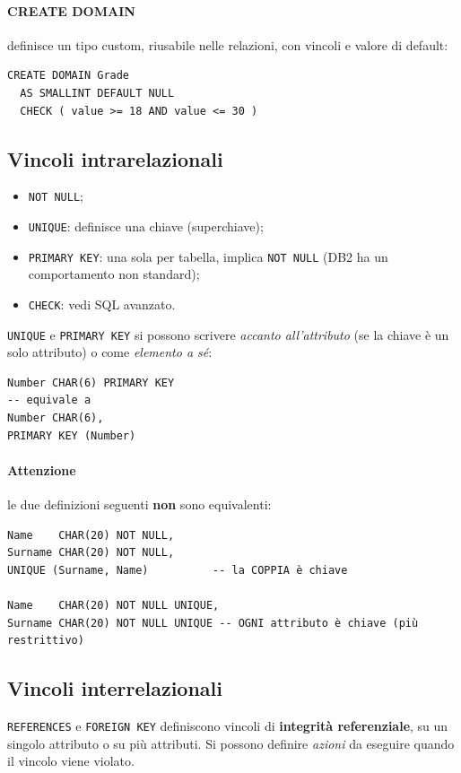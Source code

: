 \documentclass[a4paper,12pt]{article}
\begin{document}
\paragraph{CREATE DOMAIN} definisce un tipo custom, riusabile nelle relazioni,
con vincoli e valore di default:
\begin{verbatim}
CREATE DOMAIN Grade
  AS SMALLINT DEFAULT NULL
  CHECK ( value >= 18 AND value <= 30 )
\end{verbatim}

\subsection{Vincoli intrarelazionali}

\begin{itemize}
  \item \texttt{NOT NULL};
  \item \texttt{UNIQUE}: definisce una chiave (superchiave);
  \item \texttt{PRIMARY KEY}: una sola per tabella, implica \texttt{NOT NULL}
    (DB2 ha un comportamento non standard);
  \item \texttt{CHECK}: vedi SQL avanzato.
\end{itemize}

\texttt{UNIQUE} e \texttt{PRIMARY KEY} si possono scrivere \emph{accanto
all'attributo} (se la chiave è un solo attributo) o come \emph{elemento a sé}:
\begin{verbatim}
Number CHAR(6) PRIMARY KEY
-- equivale a
Number CHAR(6),
PRIMARY KEY (Number)
\end{verbatim}

\paragraph{Attenzione} le due definizioni seguenti \textbf{non} sono
equivalenti:
\begin{verbatim}
Name    CHAR(20) NOT NULL,
Surname CHAR(20) NOT NULL,
UNIQUE (Surname, Name)          -- la COPPIA è chiave

Name    CHAR(20) NOT NULL UNIQUE,
Surname CHAR(20) NOT NULL UNIQUE -- OGNI attributo è chiave (più restrittivo)
\end{verbatim}

\subsection{Vincoli interrelazionali}

\texttt{REFERENCES} e \texttt{FOREIGN KEY} definiscono vincoli di
\textbf{integrità referenziale}, su un singolo attributo o su più attributi. Si
possono definire \emph{azioni} da eseguire quando il vincolo viene violato.
\end{document}
